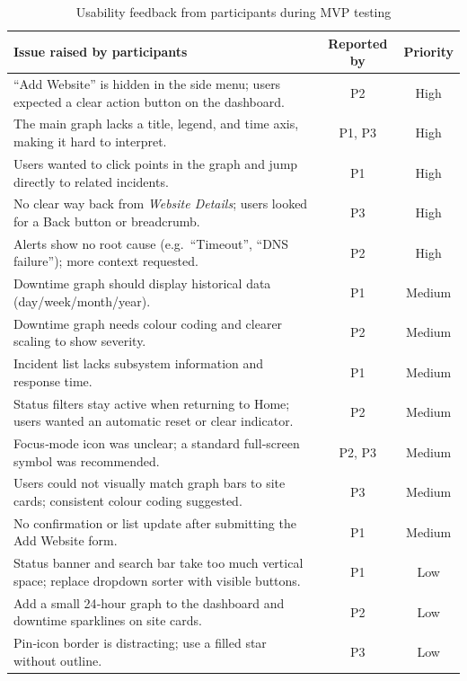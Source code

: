 \begin{table}[H]
\centering
\begin{tabular}{|p{8.2cm}|c|c|}
\hline
\textbf{Issue raised by participants} & \textbf{Reported by} & \textbf{Priority} \\ \hline
“Add Website” is hidden in the side menu; users expected a clear action button on the dashboard. & P2& High \\ \hline
The main graph lacks a title, legend, and time axis, making it hard to interpret. & P1, P3 & High \\ \hline
Users wanted to click points in the graph and jump directly to related incidents. & P1 & High \\ \hline
No clear way back from \textit{Website Details}; users looked for a Back button or breadcrumb. & P3 & High \\ \hline
Alerts show no root cause (e.g.\ “Timeout”, “DNS failure”); more context requested. & P2 & High \\ \hline
Downtime graph should display historical data (day/week/month/year). & P1 & Medium \\ \hline
Downtime graph needs colour coding and clearer scaling to show severity. & P2 & Medium \\ \hline
Incident list lacks subsystem information and response time.& P1 & Medium \\ \hline
Status filters stay active when returning to Home; users wanted an automatic reset or clear indicator. & P2 & Medium \\ \hline
Focus‑mode icon was unclear; a standard full‑screen symbol was recommended. & P2, P3 & Medium \\ \hline
Users could not visually match graph bars to site cards; consistent colour coding suggested. & P3 & Medium \\ \hline
No confirmation or list update after submitting the Add Website form. & P1 & Medium \\ \hline
Status banner and search bar take too much vertical space; replace dropdown sorter with visible buttons. & P1 & Low \\ \hline
Add a small 24‑hour graph to the dashboard and downtime sparklines on site cards. & P2 & Low \\ \hline
Pin‑icon border is distracting; use a filled star without outline. & P3 & Low \\ \hline
\end{tabular}
\caption{Usability feedback from participants during MVP testing}
\label{tab:mvp-issues}
\end{table}

